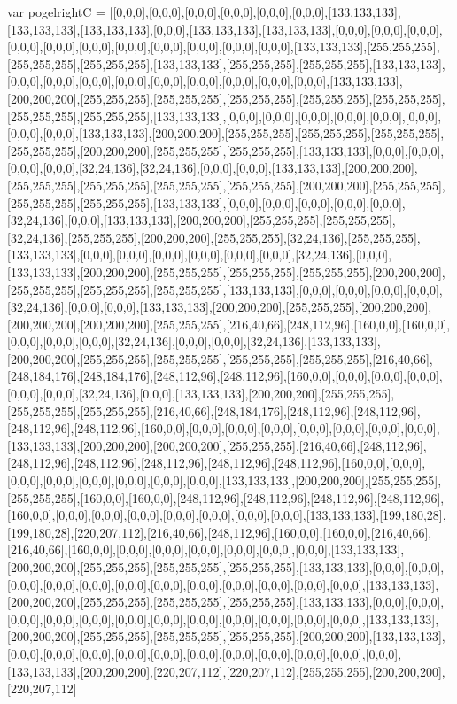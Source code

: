 var pogelrightC = [[0,0,0],[0,0,0],[0,0,0],[0,0,0],[0,0,0],[0,0,0],[133,133,133],[133,133,133],[133,133,133],[0,0,0],[133,133,133],[133,133,133],[0,0,0],[0,0,0],[0,0,0],[0,0,0],[0,0,0],[0,0,0],[0,0,0],[0,0,0],[0,0,0],[0,0,0],[0,0,0],[133,133,133],[255,255,255],[255,255,255],[255,255,255],[133,133,133],[255,255,255],[255,255,255],[133,133,133],[0,0,0],[0,0,0],[0,0,0],[0,0,0],[0,0,0],[0,0,0],[0,0,0],[0,0,0],[0,0,0],[133,133,133],[200,200,200],[255,255,255],[255,255,255],[255,255,255],[255,255,255],[255,255,255],[255,255,255],[255,255,255],[133,133,133],[0,0,0],[0,0,0],[0,0,0],[0,0,0],[0,0,0],[0,0,0],[0,0,0],[0,0,0],[133,133,133],[200,200,200],[255,255,255],[255,255,255],[255,255,255],[255,255,255],[200,200,200],[255,255,255],[255,255,255],[133,133,133],[0,0,0],[0,0,0],[0,0,0],[0,0,0],[32,24,136],[32,24,136],[0,0,0],[0,0,0],[133,133,133],[200,200,200],[255,255,255],[255,255,255],[255,255,255],[255,255,255],[200,200,200],[255,255,255],[255,255,255],[255,255,255],[133,133,133],[0,0,0],[0,0,0],[0,0,0],[0,0,0],[0,0,0],[32,24,136],[0,0,0],[133,133,133],[200,200,200],[255,255,255],[255,255,255],[32,24,136],[255,255,255],[200,200,200],[255,255,255],[32,24,136],[255,255,255],[133,133,133],[0,0,0],[0,0,0],[0,0,0],[0,0,0],[0,0,0],[0,0,0],[32,24,136],[0,0,0],[133,133,133],[200,200,200],[255,255,255],[255,255,255],[255,255,255],[200,200,200],[255,255,255],[255,255,255],[255,255,255],[133,133,133],[0,0,0],[0,0,0],[0,0,0],[0,0,0],[32,24,136],[0,0,0],[0,0,0],[133,133,133],[200,200,200],[255,255,255],[200,200,200],[200,200,200],[200,200,200],[255,255,255],[216,40,66],[248,112,96],[160,0,0],[160,0,0],[0,0,0],[0,0,0],[0,0,0],[32,24,136],[0,0,0],[0,0,0],[32,24,136],[133,133,133],[200,200,200],[255,255,255],[255,255,255],[255,255,255],[255,255,255],[216,40,66],[248,184,176],[248,184,176],[248,112,96],[248,112,96],[160,0,0],[0,0,0],[0,0,0],[0,0,0],[0,0,0],[0,0,0],[32,24,136],[0,0,0],[133,133,133],[200,200,200],[255,255,255],[255,255,255],[255,255,255],[216,40,66],[248,184,176],[248,112,96],[248,112,96],[248,112,96],[248,112,96],[160,0,0],[0,0,0],[0,0,0],[0,0,0],[0,0,0],[0,0,0],[0,0,0],[0,0,0],[133,133,133],[200,200,200],[200,200,200],[255,255,255],[216,40,66],[248,112,96],[248,112,96],[248,112,96],[248,112,96],[248,112,96],[248,112,96],[160,0,0],[0,0,0],[0,0,0],[0,0,0],[0,0,0],[0,0,0],[0,0,0],[0,0,0],[133,133,133],[200,200,200],[255,255,255],[255,255,255],[160,0,0],[160,0,0],[248,112,96],[248,112,96],[248,112,96],[248,112,96],[160,0,0],[0,0,0],[0,0,0],[0,0,0],[0,0,0],[0,0,0],[0,0,0],[0,0,0],[133,133,133],[199,180,28],[199,180,28],[220,207,112],[216,40,66],[248,112,96],[160,0,0],[160,0,0],[216,40,66],[216,40,66],[160,0,0],[0,0,0],[0,0,0],[0,0,0],[0,0,0],[0,0,0],[0,0,0],[133,133,133],[200,200,200],[255,255,255],[255,255,255],[255,255,255],[133,133,133],[0,0,0],[0,0,0],[0,0,0],[0,0,0],[0,0,0],[0,0,0],[0,0,0],[0,0,0],[0,0,0],[0,0,0],[0,0,0],[0,0,0],[133,133,133],[200,200,200],[255,255,255],[255,255,255],[255,255,255],[133,133,133],[0,0,0],[0,0,0],[0,0,0],[0,0,0],[0,0,0],[0,0,0],[0,0,0],[0,0,0],[0,0,0],[0,0,0],[0,0,0],[0,0,0],[133,133,133],[200,200,200],[255,255,255],[255,255,255],[255,255,255],[200,200,200],[133,133,133],[0,0,0],[0,0,0],[0,0,0],[0,0,0],[0,0,0],[0,0,0],[0,0,0],[0,0,0],[0,0,0],[0,0,0],[0,0,0],[133,133,133],[200,200,200],[220,207,112],[220,207,112],[255,255,255],[200,200,200],[220,207,112]